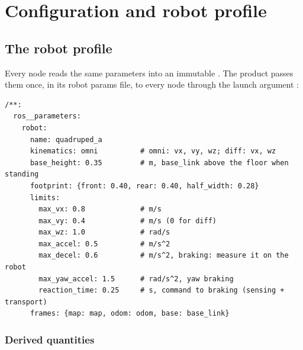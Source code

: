 \chapter{Configuration and robot profile}
\label{ch:config}

\section{The robot profile}

Every node reads the same  parameters into an immutable
. The product passes them once, in its robot params file,
to every node through the launch argument :

\begin{lstlisting}
/**:
  ros__parameters:
    robot:
      name: quadruped_a
      kinematics: omni          # omni: vx, vy, wz; diff: vx, wz
      base_height: 0.35         # m, base_link above the floor when standing
      footprint: {front: 0.40, rear: 0.40, half_width: 0.28}
      limits:
        max_vx: 0.8             # m/s
        max_vy: 0.4             # m/s (0 for diff)
        max_wz: 1.0             # rad/s
        max_accel: 0.5          # m/s^2
        max_decel: 0.6          # m/s^2, braking: measure it on the robot
        max_yaw_accel: 1.5      # rad/s^2, yaw braking
        reaction_time: 0.25     # s, command to braking (sensing + transport)
      frames: {map: map, odom: odom, base: base_link}
\end{lstlisting}

\readonlynote



\subsection{Derived quantities}

